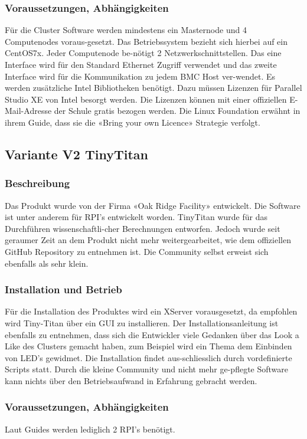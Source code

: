 \subsubsection{Voraussetzungen, Abhängigkeiten}
Für die Cluster Software werden mindestens ein Masternode und 4 Computenodes voraus-gesetzt. Das Betriebssystem bezieht sich hierbei auf ein CentOS7x. Jeder Computenode be-nötigt 2 Netzwerkschnittstellen. Das eine Interface wird für den Standard Ethernet Zugriff verwendet und das zweite Interface wird für die Kommunikation zu jedem BMC Host ver-wendet. Es werden zusätzliche Intel Bibliotheken benötigt. Dazu müssen Lizenzen für Parallel Studio XE von Intel besorgt werden. Die Lizenzen können mit einer offiziellen E-Mail-Adresse der Schule gratis bezogen werden. Die Linux Foundation erwähnt in ihrem Guide, dass sie die «Bring your own Licence» Strategie verfolgt.

\subsection{Variante V2 \flqq TinyTitan\frqq}
\subsubsection{Beschreibung}
Das Produkt wurde von der Firma «Oak Ridge Facility» entwickelt. Die Software ist unter anderem für RPI’s entwickelt worden. TinyTitan wurde für das Durchführen wissenschaftli-cher Berechnungen entworfen. Jedoch wurde seit geraumer Zeit an dem Produkt nicht mehr weitergearbeitet, wie dem offiziellen GitHub Repository zu entnehmen ist. Die Community selbst erweist sich ebenfalls als sehr klein. 

\subsubsection{Installation und Betrieb}
Für die Installation des Produktes wird ein XServer vorausgesetzt, da empfohlen wird Tiny-Titan über ein GUI zu installieren. Der Installationsanleitung ist ebenfalls zu entnehmen, dass sich die Entwickler viele Gedanken über das Look a Like des Clusters gemacht haben, zum Beispiel wird ein Thema dem Einbinden von LED’s gewidmet. Die Installation findet aus-schliesslich durch vordefinierte Scripts statt. Durch die kleine Community und nicht mehr ge-pflegte Software kann nichts über den Betriebsaufwand in Erfahrung gebracht werden.

\subsubsection{Voraussetzungen, Abhängigkeiten}
Laut Guides werden lediglich 2 RPI’s benötigt.

